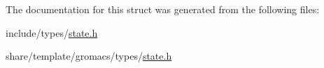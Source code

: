 \-The documentation for this struct was generated from the following files\-:\begin{DoxyCompactItemize}
\item 
include/types/\hyperlink{include_2types_2state_8h}{state.\-h}\item 
share/template/gromacs/types/\hyperlink{share_2template_2gromacs_2types_2state_8h}{state.\-h}\end{DoxyCompactItemize}
